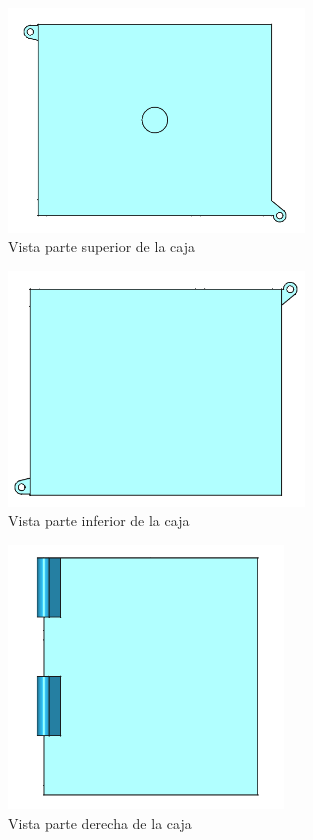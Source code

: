 \begin{figure}[H]
	\centering
	\includegraphics[width=0.7\textwidth]{images/4-DesarrolloTeorico/4-1-caja/CAJA_3D_ARRIBA.png}
	\caption{Vista parte superior de la caja}
\end{figure}

\begin{figure}[H]
	\centering
	\includegraphics[width=0.7\textwidth]{images/4-DesarrolloTeorico/4-1-caja/CAJA_3D_ABAJO.png}
	\caption{Vista parte inferior de la caja}
\end{figure}

\begin{figure}[H]
	\centering
	\includegraphics[width=0.65\textwidth]{images/4-DesarrolloTeorico/4-1-caja/CAJA_3D_DER.png}
	\caption{Vista parte derecha de la caja}
\end{figure}

